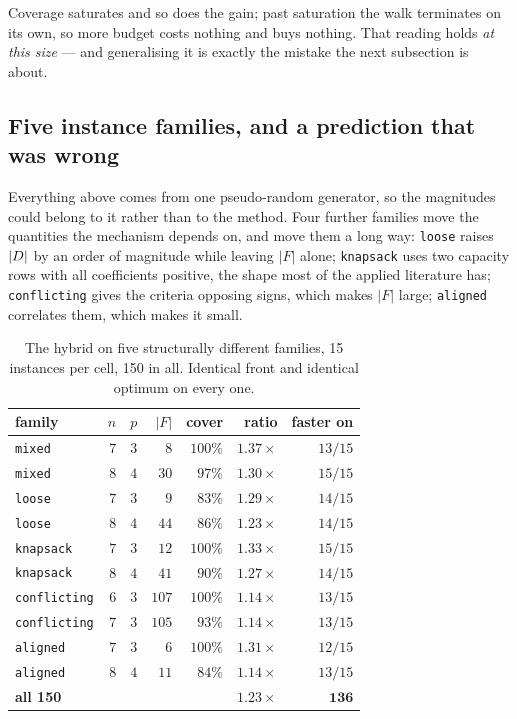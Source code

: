 \documentclass[11pt,a4paper]{article}
\begin{document}
\noindent
Coverage saturates and so does the gain; past saturation the walk terminates
on its own, so more budget costs nothing and buys nothing.  That reading holds
\emph{at this size} --- and generalising it is exactly the mistake the next
subsection is about.

\subsection{Five instance families, and a prediction that was wrong}
\label{sec:families}

Everything above comes from one pseudo-random generator, so the magnitudes
could belong to it rather than to the method.  Four further families move the
quantities the mechanism depends on, and move them a long way: \texttt{loose}
raises $|D|$ by an order of magnitude while leaving $|F|$ alone;
\texttt{knapsack} uses two capacity rows with all coefficients positive, the
shape most of the applied literature has; \texttt{conflicting} gives the
criteria opposing signs, which makes $|F|$ large; \texttt{aligned} correlates
them, which makes it small.

\begin{table}[h]
\centering
\caption{The hybrid on five structurally different families, 15 instances per
cell, 150 in all.  Identical front and identical optimum on every one.}
\label{tab:families}
\begin{tabular}{lrrrrrr}
\toprule
family & $n$ & $p$ & $|F|$ & cover & ratio & faster on \\
\midrule
\texttt{mixed}       & $7$ & $3$ & $8$   & $100\%$ & $\mathbf{1.37\times}$ & $13/15$ \\
\texttt{mixed}       & $8$ & $4$ & $30$  & $97\%$  & $1.30\times$ & $15/15$ \\
\texttt{loose}       & $7$ & $3$ & $9$   & $83\%$  & $1.29\times$ & $14/15$ \\
\texttt{loose}       & $8$ & $4$ & $44$  & $86\%$  & $1.23\times$ & $14/15$ \\
\texttt{knapsack}    & $7$ & $3$ & $12$  & $100\%$ & $1.33\times$ & $15/15$ \\
\texttt{knapsack}    & $8$ & $4$ & $41$  & $90\%$  & $1.27\times$ & $14/15$ \\
\texttt{conflicting} & $6$ & $3$ & $107$ & $100\%$ & $1.14\times$ & $13/15$ \\
\texttt{conflicting} & $7$ & $3$ & $105$ & $93\%$  & $1.14\times$ & $13/15$ \\
\texttt{aligned}     & $7$ & $3$ & $6$   & $100\%$ & $1.31\times$ & $12/15$ \\
\texttt{aligned}     & $8$ & $4$ & $11$  & $84\%$  & $1.14\times$ & $13/15$ \\
\midrule
\textbf{all 150} & & & & & $\mathbf{1.23\times}$ & $\mathbf{136}$ \\
\bottomrule
\end{tabular}
\end{table}
\end{document}
